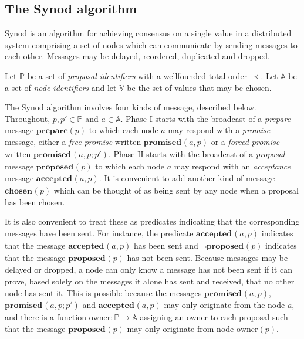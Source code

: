 \documentclass[journal]{IEEEtran}
\begin{document}
\subsection{The Synod algorithm}

Synod is an algorithm for achieving consensus on a single value in a
distributed system comprising a set of nodes which can communicate by sending
messages to each other. Messages may be delayed, reordered, duplicated and
dropped.

Let $\mathbb P$ be a set of \textit{proposal identifiers} with a wellfounded
total order $\prec$. Let $\mathbb A$ be a set of \textit{node identifiers} and
let $\mathbb V$ be the set of values that may be chosen.

\def\prep#1{\mathbf{prepare}(#1)}
\def\mprom#1#2#3{\mathbf{promised}_{\ge #1}(#2,#3)}
\def\fprom#1#2#3{\mathbf{promised}_{#1}(#2,#3)}
\def\bprom#1#2#3#4{\mathbf{promised}_{#1}(#2,#3;#4)}
\def\prop#1#2{\mathbf{proposed}_{#1}(#2)}
\def\acc#1#2#3{\mathbf{accepted}_{#1}(#2,#3)}
\def\chosen#1#2{\mathbf{chosen}_{#1}(#2)}
\def\owner#1{\mathrm{owner}(#1)}

The Synod algorithm involves four kinds of message, described below.
Throughout, $p, p' \in \mathbb P$ and $a \in \mathbb A$.  Phase I starts with
the broadcast of a \textit{prepare} message $\prep{p}$ to which each node $a$
may respond with a \textit{promise} message, either a \textit{free promise}
written $\fprom{}{a}{p}$ or a \textit{forced promise} written
$\bprom{}{a}{p}{p'}$.  Phase II starts with the broadcast of a
\textit{proposal} message $\prop{}{p}$ to which each node $a$ may respond with
an \textit{acceptance} message $\acc{}{a}{p}$. It is convenient to add another
kind of message $\chosen{}{p}$ which can be thought of as being sent by any
node when a proposal has been chosen.

It is also convenient to treat these as predicates indicating that the
corresponding messages have been sent. For instance, the predicate
$\acc{}{a}{p}$ indicates that the message $\acc{}{a}{p}$ has been sent and
$\neg \prop{}{p}$ indicates that the message $\prop{}{p}$ has not been sent.
Because messages may be delayed or dropped, a node can only know a message has
not been sent if it can prove, based solely on the messages it alone has sent
and received, that no other node has sent it. This is possible because the
messages $\fprom{}{a}{p}$, $\bprom{}{a}{p}{p'}$ and $\acc{}{a}{p}$ may only
originate from the node $a$, and there is a function $\mathrm{owner} : \mathbb
P \to \mathbb A$ assigning an owner to each proposal such that the message
$\prop{}{p}$ may only originate from node $\mathrm{owner}(p)$.
\end{document}
